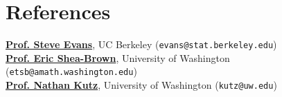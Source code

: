 \section{\sc References}

{\bf \href{https://www.stat.berkeley.edu/~evans/}{Prof. Steve Evans}}, UC Berkeley (\texttt{evans@stat.berkeley.edu})\\
{\bf \href{http://faculty.washington.edu/etsb/}{Prof. Eric Shea-Brown}}, University of Washington (\texttt{etsb@amath.washington.edu})\\
{\bf \href{http://faculty.washington.edu/kutz/}{Prof. Nathan Kutz}}, University of Washington (\texttt{kutz@uw.edu})\\

\endinput
